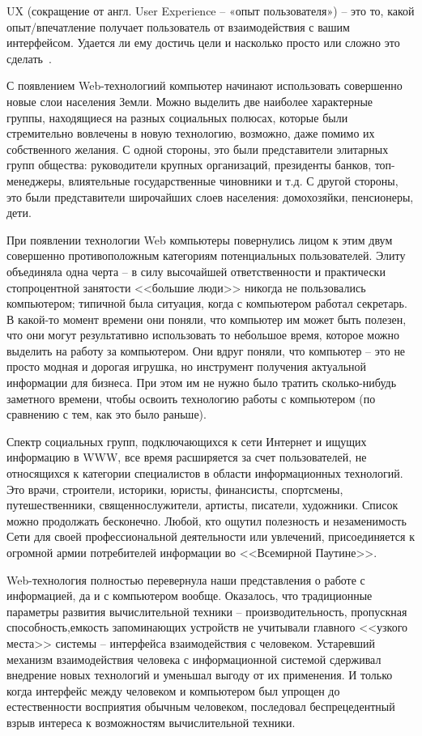 UX (сокращение от англ. User Experience -- «опыт пользователя») -- это то, какой опыт/впечатление получает пользователь от взаимодействия с вашим интерфейсом. Удается ли ему достичь цели и насколько просто или сложно это сделать~\cite{habr_ux}.

\label{sec:introduction}

С появлением Web-технологиий компьютер начинают использовать совершенно новые слои населения Земли. Можно выделить две наиболее характерные группы, находящиеся на разных социальных полюсах, которые были стремительно вовлечены в новую технологию, возможно, даже помимо их собственного желания. С одной стороны, это были представители элитарных групп общества: руководители крупных организаций, президенты банков, топ- менеджеры, влиятельные государственные чиновники и т.д. С другой стороны, это были представители широчайших слоев населения: домохозяйки, пенсионеры, дети.

При появлении технологии Web компьютеры повернулись лицом к этим двум совершенно противоположным категориям потенциальных пользователей. Элиту объединяла одна черта -- в силу высочайшей ответственности и практически стопроцентной занятости <<большие люди>> никогда не пользовались компьютером; типичной была ситуация, когда с компьютером работал секретарь. В какой-то момент времени они поняли, что компьютер им может быть полезен, что они могут результативно использовать то небольшое время, которое можно выделить на работу за компьютером. Они вдруг поняли, что компьютер -- это не просто модная и дорогая игрушка, но инструмент получения актуальной информации для бизнеса. При этом им не нужно было тратить сколько-нибудь заметного времени, чтобы освоить технологию работы с компьютером (по сравнению с тем, как это было раньше).

Спектр социальных групп, подключающихся к сети Интернет и ищущих информацию в WWW, все время расширяется за счет пользователей, не относящихся к категории специалистов в области информационных технологий. Это врачи, строители, историки, юристы, финансисты, спортсмены, путешественники, священнослужители, артисты, писатели, художники. Список можно продолжать бесконечно. Любой, кто ощутил полезность и незаменимость Сети для своей профессиональной деятельности или увлечений, присоединяется к огромной армии потребителей информации во <<Всемирной Паутине>>.

Web-технология полностью перевернула наши представления о работе с информацией, да и с компьютером вообще. Оказалось, что традиционные параметры развития вычислительной техники -- производительность, пропускная способность,емкость запоминающих устройств не учитывали главного <<узкого места>> системы -- интерфейса взаимодействия с человеком. Устаревший механизм взаимодействия человека с информационной системой сдерживал внедрение новых технологий и уменьшал выгоду от их применения. И только когда интерфейс между человеком и компьютером был упрощен до естественности восприятия обычным человеком, последовал беспрецедентный взрыв интереса к возможностям вычислительной техники.

